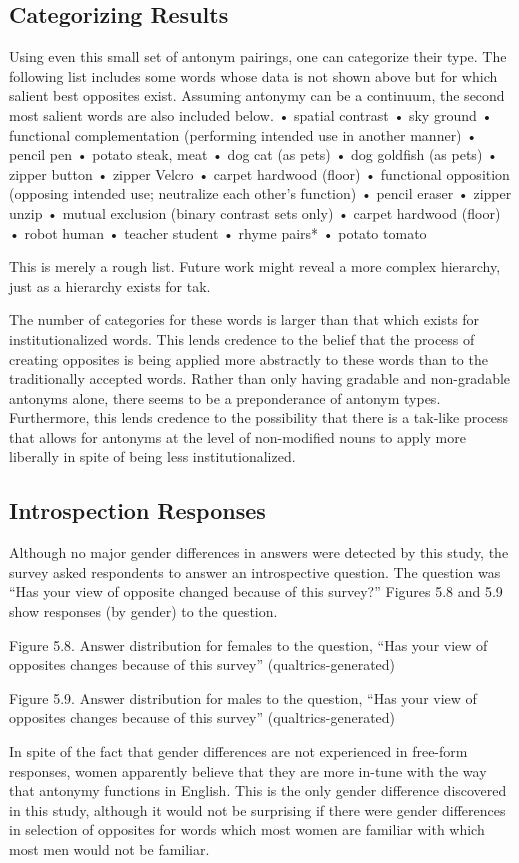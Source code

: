\subsection {Categorizing Results} Using even this small set of antonym pairings, one can categorize their type.  The following list includes some words whose data is not shown above but for which salient best opposites exist.  Assuming antonymy can be a continuum, the second most salient words are also included below.
	•	spatial contrast
	•	sky \opp ground
	•	functional complementation (performing intended use in another manner) 
	•	pencil \opp pen
	•	potato \opp steak, meat
	•	dog \opp cat (as pets)
	•	dog \opp goldfish (as pets)
	•	zipper \opp button
	•	zipper \opp Velcro
	•	carpet \opp hardwood (floor)
	•	functional opposition (opposing intended use; neutralize each other’s function) 
	•	pencil \opp eraser
	•	zipper \opp unzip
	•	mutual exclusion (binary contrast sets only)
	•	carpet \opp hardwood (floor)
	•	robot \opp human
	•	teacher \opp student
	•	rhyme pairs*
	•	potato \opp tomato

This is merely a rough list.  Future work might reveal a more complex hierarchy, just as a hierarchy exists for tak.  

The number of categories for these words is larger than that which exists for institutionalized words.  This lends credence to the belief that the process of creating opposites is being applied more abstractly to these words than to the traditionally accepted words. Rather than only having gradable and non-gradable antonyms alone, there seems to be a preponderance of antonym types.  Furthermore, this lends credence to the possibility that there is a tak-like process that allows for antonyms at the level of non-modified nouns to apply more liberally in spite of being less institutionalized.

\subsection {Introspection Responses} Although no major gender differences in answers were detected by this study, the survey asked respondents to answer an introspective question.  The question was “Has your view of opposite changed because of this survey?”  Figures 5.8 and 5.9 show responses (by gender) to the question.  

Figure 5.8. Answer distribution for females to the question, “Has your view of opposites changes because of this survey” (qualtrics-generated)

  Figure 5.9. Answer distribution for males to the question, “Has your view of opposites changes because of this survey” (qualtrics-generated)

In spite of the fact that gender differences are not experienced in free-form responses, women apparently believe that they are more in-tune with the way that antonymy functions in English.  This is the only gender difference discovered in this study, although it would not be surprising if there were gender differences in selection of opposites for words which most women are familiar with which most men would not be familiar.